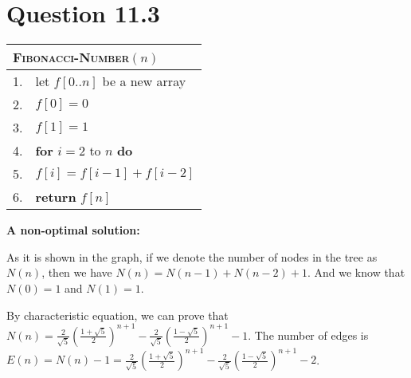 \documentclass[a4paper,12pt]{article}
\begin{document}
\section*{Question 11.3}

\begin{center}
	\begin{tabular}{ll}
		\toprule
		\multicolumn{2}{l}{\textsc{Fibonacci-Number}$(n)$} \\
		\midrule
		1. & let $f[0..n]$ be a new array \\
		2. & $f[0] = 0$ \\
		3. & $f[1] = 1$ \\
		4. & \textbf{for} $i = 2$ to $n$ \textbf{do} \\
		5. & \qquad $f[i] = f[i-1] + f[i-2]$ \\
		6. & \textbf{return} $f[n]$ \\
		\bottomrule
	\end{tabular}
\end{center}

\textbf{A non-optimal solution:}

\begin{center}
\end{center}

As it is shown in the graph, if we denote the number of nodes in the tree as $N(n)$, then we have $N(n) = N(n-1) + N(n-2) + 1$. 
And we know that $N(0) = 1$ and $N(1) = 1$.

By characteristic equation, we can prove that $N(n) = \frac{2}{\sqrt{5}}(\frac{1+\sqrt{5}}{2})^{n+1} - \frac{2}{\sqrt{5}}(\frac{1-\sqrt{5}}{2})^{n+1} - 1$.
The number of edges is $E(n) = N(n) - 1 = \frac{2}{\sqrt{5}}(\frac{1+\sqrt{5}}{2})^{n+1} - \frac{2}{\sqrt{5}}(\frac{1-\sqrt{5}}{2})^{n+1} - 2$.
\end{document}
